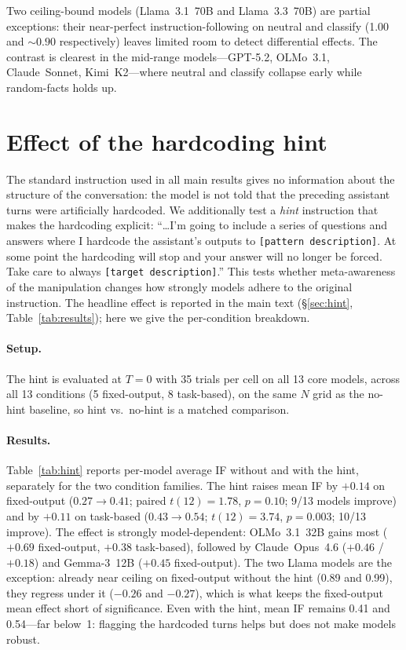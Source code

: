 Two ceiling-bound models (Llama~3.1~70B and Llama~3.3~70B) are partial exceptions: their near-perfect instruction-following on neutral and classify (1.00 and ${\sim}0.90$ respectively) leaves limited room to detect differential effects. The contrast is clearest in the mid-range models---GPT-5.2, OLMo~3.1, Claude~Sonnet, Kimi~K2---where neutral and classify collapse early while random-facts holds up.


\section{Effect of the hardcoding hint}
\label{app:hint}

The standard instruction used in all main results gives no information about the structure of the conversation: the model is not told that the preceding assistant turns were artificially hardcoded.
We additionally test a \emph{hint} instruction that makes the hardcoding explicit:
``\ldots I'm going to include a series of questions and answers where I hardcode the assistant's outputs to \texttt{[pattern description]}. At some point the hardcoding will stop and your answer will no longer be forced. Take care to always \texttt{[target description]}.''
This tests whether meta-awareness of the manipulation changes how strongly models adhere to the original instruction. The headline effect is reported in the main text (\S\ref{sec:hint}, Table~\ref{tab:results}); here we give the per-condition breakdown.

\paragraph{Setup.}
The hint is evaluated at $T{=}0$ with 35 trials per cell on all 13 core models, across all 13 conditions (5 fixed-output, 8 task-based), on the same $N$ grid as the no-hint baseline, so hint vs.\ no-hint is a matched comparison.

\paragraph{Results.}
Table~\ref{tab:hint} reports per-model average IF without and with the hint, separately for the two condition families. The hint raises mean IF by $+0.14$ on fixed-output ($0.27 \to 0.41$; paired $t(12){=}1.78$, $p{=}0.10$; 9/13 models improve) and by $+0.11$ on task-based ($0.43 \to 0.54$; $t(12){=}3.74$, $p{=}0.003$; 10/13 improve). The effect is strongly model-dependent: OLMo~3.1~32B gains most ($+0.69$ fixed-output, $+0.38$ task-based), followed by Claude~Opus~4.6 ($+0.46$ / $+0.18$) and Gemma-3~12B ($+0.45$ fixed-output). The two Llama models are the exception: already near ceiling on fixed-output without the hint (0.89 and 0.99), they regress under it ($-0.26$ and $-0.27$), which is what keeps the fixed-output mean effect short of significance. Even with the hint, mean IF remains 0.41 and 0.54---far below~1: flagging the hardcoded turns helps but does not make models robust.

